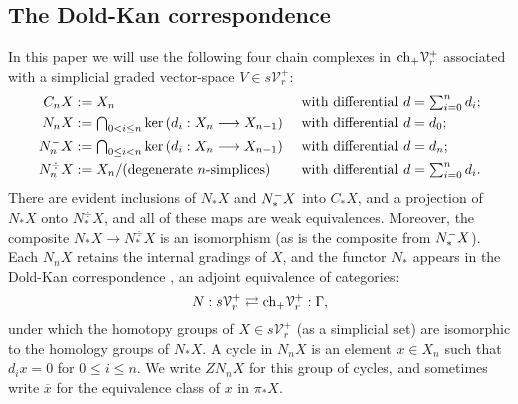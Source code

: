\documentclass[11pt]{amsart}
\theoremstyle{plain}
\theoremstyle{definition}
\renewcommand{\ker}{\textup{ker}\,}
\renewcommand{\to}{\longrightarrow}
\newcommand{\calV}{\mathcal{V}}
\theoremstyle{plain}
\newcommand{\vect}[2]{\calV^{#1}_{#2}}
\newcommand{\Nop}{N^{\smash{-}}}
\newcommand{\complexes}{\textup{ch}_+}
\begin{document}
\begin{Conventions and notation}
\subsection{The Dold-Kan correspondence}\label{The Dold-Kan correspondence}
In this paper we will use the following four chain complexes in $\complexes \vect{+}{r}$ associated with a simplicial graded vector-space $V\in s\vect{+}{r}$:
\begin{alignat*}{2}
C_nX&:=X_n&& \textup{ with differential }d=\textstyle\sum_{i=0}^{n}d_i;\\
N_nX&:=\textstyle\bigcap_{0< i\leq n}\ker(d_i:X_n\to X_{n-1})&& \textup{ with differential }d=d_0;\\
\Nop_nX&:=\textstyle\bigcap_{0\leq i< n}\ker(d_i:X_n\to X_{n-1})&& \textup{ with differential }d=d_n;\\
N_n^\div X&:=X_n/(\textup{degenerate $n$-simplices})&& \textup{ with differential }d=\textstyle\sum_{i=0}^{n}d_i.
\end{alignat*}
There are evident inclusions of $N_*X$ and $\Nop_*X$ into $C_*X$, and a projection of $N_*X$ onto $N_*^\div X$, and all of these maps are weak equivalences. Moreover, the composite $N_*X\to N_*^\div X$ is an isomorphism (as is the composite from $\Nop_*X$). Each $N_nX$ retains the internal gradings of $X$, and the functor $N_*$ appears in the Dold-Kan correspondence \cite[\S III.2]{goerss-jardine.pdf}, an adjoint equivalence of categories:
\[N:s\vect{+}{r}\rightleftarrows \complexes \vect{+}{r}:\Gamma,\]
under which the homotopy groups of $X\in s\vect{+}{r}$ (as a simplicial set)  are isomorphic to the homology groups of $N_*X$.
%
A cycle in $N_nX$ is an element $x\in X_n$ such that $d_ix=0$ for $0\leq i\leq n$. We write $ZN_nX$ for this group of cycles, and sometimes write $\overline{x}$ for the equivalence class of $x$ in $\pi_*X$.


\end{Conventions and notation}
\end{document}
